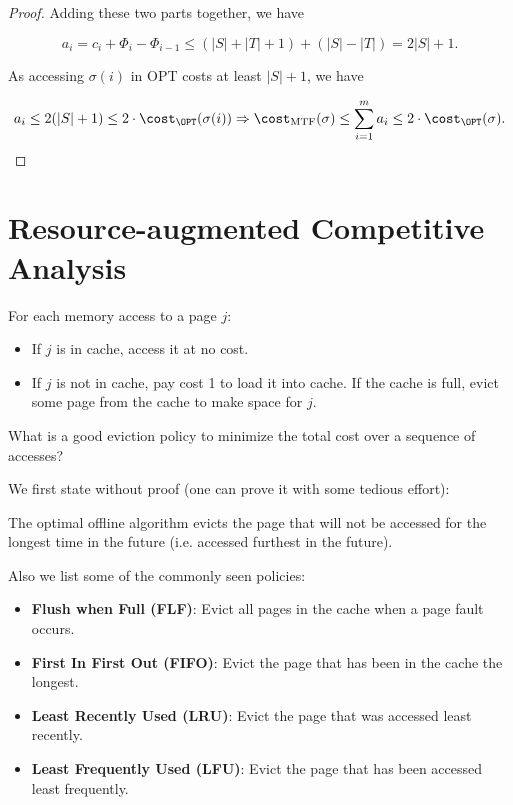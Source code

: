 \begin{proof}
Adding these two parts together, we have

\[ a_i = c_i + \Phi_i - \Phi_{i-1} \leq (|S| + |T| + 1) + (|S| - |T|) = 2|S| + 1. \]

As accessing $\sigma(i)$ in OPT costs at least $|S| + 1$, we have

\[ a_i \leq 2(|S| + 1) \leq 2 \cdot \cost_{\OPT}(\sigma(i)) \Rightarrow \cost_{\text{MTF}}(\sigma) \leq \sum_{i=1}^m a_i \leq 2 \cdot \cost_{\OPT}(\sigma). \]
\end{proof}

\section{Resource-augmented Competitive Analysis}

\begin{question}
  For each memory access to a page $j$:
  \begin {itemize}
    \item If $j$ is in cache, access it at no cost.
    \item If $j$ is not in cache, pay cost 1 to load it into cache. If the cache is full, evict some page from the cache to make space for $j$.
  \end{itemize}
  What is a good eviction policy to minimize the total cost over a sequence of accesses?
\end{question}

We first state without proof (one can prove it with some tedious effort):

\begin{theorem}
  The optimal offline algorithm evicts the page that will not be accessed for the longest time in the future (i.e. accessed furthest in the future).
\end{theorem}

Also we list some of the commonly seen policies:

\begin{itemize}
  \item \textbf{Flush when Full (FLF)}: Evict all pages in the cache when a page fault occurs.
  \item \textbf{First In First Out (FIFO)}: Evict the page that has been in the cache the longest.
  \item \textbf{Least Recently Used (LRU)}: Evict the page that was accessed least recently.
  \item \textbf{Least Frequently Used (LFU)}: Evict the page that has been accessed least frequently.
\end{itemize}

